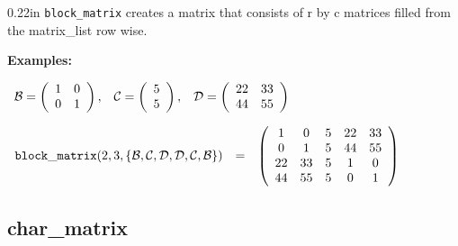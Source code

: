 \begin{addtolength}{\leftskip}{0.22in}
{\tt block\_matrix} creates a matrix that consists of r by c matrices 
filled from the matrix\_list row wise.

\end{addtolength}


{\bf Examples:}

\begin{flushleft}  
\hspace*{0.1in}
\begin{math}  
\begin{array}{ccc}
{\cal B} = \left( \begin{array}{cc} 1 & 0 \\ 0 & 1
\end{array} \right), & 
{\cal C} = \left( \begin{array}{c} 5 \\ 5
\end{array} \right), &
{\cal D} = \left( \begin{array}{cc} 22 & 33 \\ 44 & 55
\end{array} \right) 
\end{array}
\end{math}  
\end{flushleft}

\vspace*{0.175in}

\begin{flushleft}  
\hspace*{0.1in}
\begin{math}  
\begin{array}{ccc}
{\tt block\_matrix}(2,3,\{{\cal B,C,D,D,C,B}\}) & = & 
\left( \begin{array}{ccccc} 1 & 0 & 5 & 22 & 33 \\ 0 & 1 & 5 & 44 & 55 
\\
22 & 33 & 5 & 1 & 0 \\ 44 & 55 & 5 & 0 & 1
\end{array} \right)  
\end{array}  
\end{math}  
\end{flushleft}


\subsection{char\_matrix}


